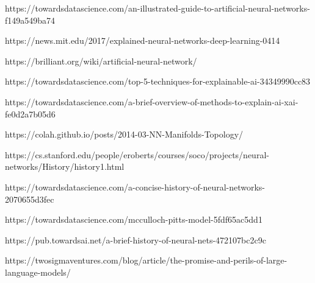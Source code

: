 https://towardsdatascience.com/an-illustrated-guide-to-artificial-neural-networks-f149a549ba74

https://news.mit.edu/2017/explained-neural-networks-deep-learning-0414

https://brilliant.org/wiki/artificial-neural-network/

https://towardsdatascience.com/top-5-techniques-for-explainable-ai-34349990cc83

https://towardsdatascience.com/a-brief-overview-of-methods-to-explain-ai-xai-fe0d2a7b05d6

https://colah.github.io/posts/2014-03-NN-Manifolds-Topology/

https://cs.stanford.edu/people/eroberts/courses/soco/projects/neural-networks/History/history1.html

https://towardsdatascience.com/a-concise-history-of-neural-networks-2070655d3fec

https://towardsdatascience.com/mcculloch-pitts-model-5fdf65ac5dd1

https://pub.towardsai.net/a-brief-history-of-neural-nets-472107bc2c9c

https://twosigmaventures.com/blog/article/the-promise-and-perils-of-large-language-models/